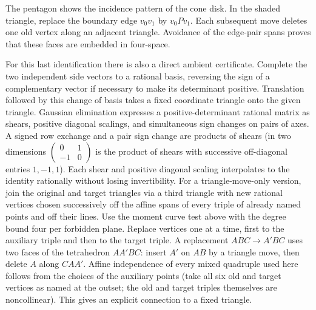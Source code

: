 \begin{center}
\end{center}
\noindent The pentagon shows the incidence pattern of the cone disk. In the shaded triangle, replace the boundary edge $v_0v_1$ by $v_0Pv_1$. Each subsequent move deletes one old vertex along an adjacent triangle. Avoidance of the edge-pair spans proves that these faces are embedded in four-space.

For this last identification there is also a direct ambient certificate. Complete the two independent side vectors to a rational basis, reversing the sign of a complementary vector if necessary to make its determinant positive. Translation followed by this change of basis takes a fixed coordinate triangle onto the given triangle. Gaussian elimination expresses a positive-determinant rational matrix as shears, positive diagonal scalings, and simultaneous sign changes on pairs of axes. A signed row exchange and a pair sign change are products of shears (in two dimensions $\left(\begin{smallmatrix}0&1\\-1&0\end{smallmatrix}\right)$ is the product of shears with successive off-diagonal entries $1,-1,1$). Each shear and positive diagonal scaling interpolates to the identity rationally without losing invertibility. For a triangle-move-only version, join the original and target triangles via a third triangle with new rational vertices chosen successively off the affine spans of every triple of already named points and off their lines. Use the moment curve test above with the degree bound four per forbidden plane. Replace vertices one at a time, first to the auxiliary triple and then to the target triple. A replacement $ABC\to A'BC$ uses two faces of the tetrahedron $AA'BC$: insert $A'$ on $AB$ by a triangle move, then delete $A$ along $CA A'$. Affine independence of every mixed quadruple used here follows from the choices of the auxiliary points (take all six old and target vertices as named at the outset; the old and target triples themselves are noncollinear). This gives an explicit connection to a fixed triangle.

